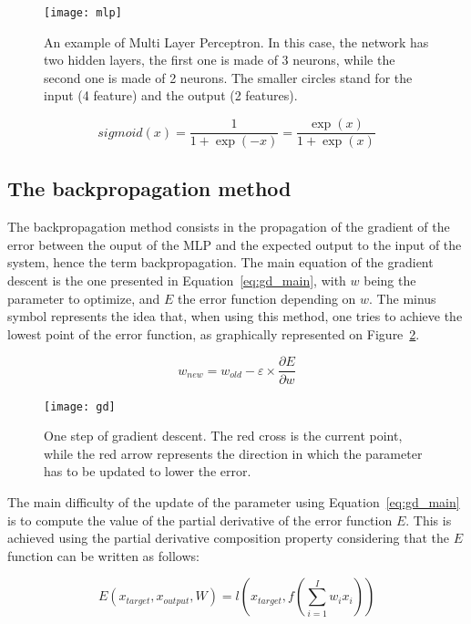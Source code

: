     \begin{figure}[h]
        \centering
        \texttt{[image: mlp]}
        \caption{An example of Multi Layer Perceptron. In this case, the network has two hidden layers, the first one is made of 3 neurons, while the second one is made of 2 neurons. The smaller circles stand for the input (4 feature) and the output (2 features).}
\label{fig:mlp}
    \end{figure}

    \begin{equation}
        sigmoid(x) = \frac{1}{1 + \exp(-x)} = \frac{\exp(x)}{1 + \exp(x)}
        \label{eq:sigmoid}
    \end{equation}

    \subsection{The backpropagation method}
    The backpropagation method consists in the propagation of the gradient of the error between the ouput of the MLP and the expected output to the input of the system, hence the term backpropagation. The main equation of the gradient descent is the one presented in Equation~\ref{eq:gd_main}, with $w$ being the parameter to optimize, and $E$ the error function depending on $w$. The minus symbol represents the idea that, when using this method, one tries to achieve the lowest point of the error function, as graphically represented on Figure~\ref{fig:gd}. 

\begin{equation}
    w_{new} = w_{old} - \varepsilon \times \frac{\partial E}{\partial w}
    \label{eq:gd_main}
\end{equation}

    \begin{figure}[h]
        \centering
        \texttt{[image: gd]}
        \caption{One step of gradient descent. The red cross is the current point, while the red arrow represents the direction in which the parameter has to be updated to lower the error.}
\label{fig:gd}
    \end{figure}

    The main difficulty of the update of the parameter using Equation~\ref{eq:gd_main} is to compute the value of the partial derivative of the error function $E$. This is achieved using the partial derivative composition property considering that the $E$ function can be written as follows:

    \begin{equation}
        E\left(x_{target}, x_{output}, W\right) = l\left(x_{target}, f\left(\sum_{i=1}^I w_i x_i\right)\right)
        \label{eq:error_function}
    \end{equation}

